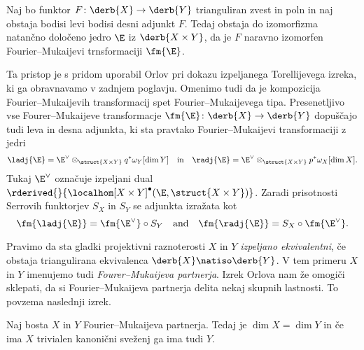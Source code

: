 \begin{izrek}
    Naj bo funktor $F \colon \derb{X} \to \derb{Y}$ trianguliran zvest in poln in naj obstaja bodisi levi bodisi desni adjunkt $F$. Tedaj obstaja do izomorfizma natančno določeno jedro $\E$ iz $\derb{X \times Y}$, da je $F$ naravno izomorfen Fourier--Mukaijevi trnsformaciji $\fm{\E}$.
\end{izrek}
Ta pristop je s pridom uporabil Orlov \cite{Orlov2003} pri dokazu izpeljanega Torellijevega izreka, ki ga obravnavamo v zadnjem poglavju. Omenimo tudi da je kompozicija Fourier--Mukaijevih transformacij spet Fourier--Mukaijevega tipa. Presenetljivo vse Fourer--Mukaijeve transformacje $\fm{\E} \colon \derb{X} \to \derb{Y}$ dopuščajo tudi leva in desna adjunkta, ki sta pravtako Fourier--Mukaijevi transformaciji z jedri 
\[
    \ladj{\E} = \E^\vee \otimes_{\struct{X \times Y}} q^*\omega_Y[\dim Y] \quad \text{in} \quad 
    \radj{\E} = \E^\vee \otimes_{\struct{X \times Y}} p^*\omega_X[\dim X].
\]
Tukaj $\E^\vee$ označuje izpeljani dual $\rderived{}{\localhom[X \times Y]^\bullet(\E, \struct{X\times Y})}$. Zaradi prisotnosti Serrovih funktorjev $S_X$ in $S_Y$ se adjunkta izražata kot
\begin{equation*}
    \fm{\ladj{\E}} = \fm{\E^\vee} \circ S_Y \quad \text{and} \quad 
    \fm{\radj{\E}} = S_X \circ \fm{\E^\vee}.
\end{equation*}

Pravimo da sta gladki projektivni raznoterosti $X$ in $Y$ \emph{izpeljano ekvivalentni}, če obstaja triangulirana ekvivalenca $\derb{X} \natiso \derb{Y}$. V tem primeru $X$ in $Y$ imenujemo tudi \emph{Fourer--Mukaijeva partnerja}. Izrek Orlova nam že omogiči sklepati, da si Fourier--Mukaijeva partnerja delita nekaj skupnih lastnosti. To povzema naslednji izrek.

\begin{izrek}
    Naj bosta $X$ in $Y$ Fourier--Mukaijeva partnerja. Tedaj je $\dim X = \dim Y$ in če ima $X$ trivialen kanonični sveženj ga ima tudi $Y$. 
\end{izrek}

